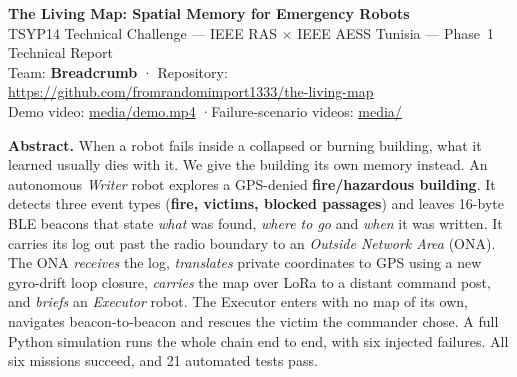 \documentclass[10pt,a4paper]{article}
\begin{document}
\begin{center}
{\LARGE\bfseries\color{ieee} The Living Map: Spatial Memory for Emergency Robots}\\[3pt]
{\large TSYP14 Technical Challenge — IEEE RAS $\times$ IEEE AESS Tunisia — Phase~1 Technical Report}\\[3pt]
{\small Team: \textbf{Breadcrumb} \quad·\quad
Repository: \url{https://github.com/fromrandomimport1333/the-living-map} \\
Demo video: \href{https://github.com/fromrandomimport1333/the-living-map/blob/main/media/demo.mp4}{media/demo.mp4} \quad·\quad Failure-scenario videos: \href{https://github.com/fromrandomimport1333/the-living-map/tree/main/media}{media/}}
\end{center}

\vspace{-4pt}
\noindent\textbf{Abstract.} When a robot fails inside a collapsed or burning building, what it learned usually dies with it.
We give the building its own memory instead. An autonomous \emph{Writer} robot explores a GPS-denied
\textbf{fire/hazardous building}. It detects three event types (\textbf{fire, victims, blocked passages}) and leaves
16-byte BLE beacons that state \emph{what} was found, \emph{where to go} and \emph{when} it was written.
It carries its log out past the radio boundary to an \emph{Outside Network Area} (ONA). The ONA
\emph{receives} the log, \emph{translates} private coordinates to GPS using a new gyro-drift loop closure,
\emph{carries} the map over LoRa to a distant command post, and \emph{briefs} an \emph{Executor} robot.
The Executor enters with no map of its own, navigates beacon-to-beacon and rescues the victim the commander chose.
A full Python simulation runs the whole chain end to end, with six injected failures. All six missions succeed, and
21 automated tests pass.
\end{document}
